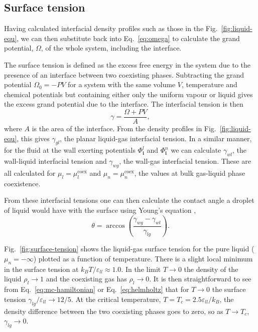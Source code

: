 \documentclass[journal=langd5,manuscript=article]{achemso}
\def\i{\mathbf{i}}
\def\e{\varepsilon}
\begin{document}
\subsection{Surface tension}\label{surface-tension}

Having calculated interfacial density profiles such as those in the
Fig.~\ref{fig:liquid-equ}, we can then substitute back into
Eq.~\eqref{eq:omega} to calculate the grand potential, $\Omega$, of the
whole system, including the interface.

The surface tension is defined as the excess free energy in the system
due to the presence of an interface between two coexisting phases.
Subtracting the grand potential $\Omega_0 = -PV$ for a system with the
same volume $V$, temperature and chemical potentials but containing
either only the uniform vapour or liquid gives the excess grand potential due to
the interface. The interfacial tension is then
%
\begin{equation}
  \gamma = \frac{\Omega + PV}A,
\end{equation}
%
where $A$ is the area of the interface. From the density profiles in
Fig.~\ref{fig:liquid-equ}, this gives $\gamma_{gl}$, the
planar liquid-gas interfacial tension. In a similar manner, for the
fluid at the wall exerting potentials $\Phi^l_\i$ and $\Phi^n_\i$ we can
calculate $\gamma_{wl}$, the wall-liquid interfacial tension and
$\gamma_{wg}$, the wall-gas interfacial tension. These are all
calculated for $\mu_l = \mu_l^{\text{coex}}$ and $\mu_n =
\mu_n^{\text{coex}}$, the values at bulk gas-liquid phase coexistence.

From these interfacial tensions one can then calculate the contact angle
a droplet of liquid would have with the surface using Young's
equation \cite{de2004capillarity},
%
\begin{equation}
  \theta = \arccos \left(
    \frac{\gamma_{wg} - \gamma_{wl}}{\gamma_{lg}}
  \right).
\label{eq:youngs}
\end{equation}

Fig.~\ref{fig:surface-tension} shows the liquid-gas surface tension for
the pure liquid ($\mu_n = -\infty$) plotted as a function of temperature.
There is a slight local minimum in the surface tension at $k_BT/\e_{ll}\approx
1.0$. In the limit $T \rightarrow 0$ the density of the liquid $\rho_l
\rightarrow 1$ and the coexisting gas has $\rho_l \rightarrow 0$. It is
then straightforward to see from Eq.~\eqref{eq:mc-hamiltonian} or
Eq.~\eqref{eq:helmholtz} that for $T \rightarrow 0$ the surface tension
$\gamma_{lg}/\e_{ll} \rightarrow 12/5$. At the critical temperature, $T
= T_c = 2.5 \e_{ll}/k_B$, the density difference between the two
coexisting phases goes to zero, so as $T \rightarrow T_c$, $\gamma_{lg}
\rightarrow 0$.
\end{document}
